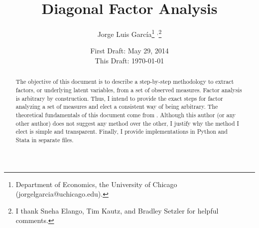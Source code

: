 



\title{Diagonal Factor Analysis}
\author{Jorge Luis Garc\'{i}a\thanks{Department of Economics, the University of Chicago (jorgelgarcia@uchicago.edu).} $^{,}$\thanks{I thank Sneha Elango, Tim Kautz, and Bradley Setzler for helpful comments.}}
\date{First Draft: May 29, 2014 \\ This Draft: \today}
\maketitle


\begin{abstract}
\noindent The objective of this document is to describe a step-by-step methodology to extract factors, or underlying latent variables, from a set of observed measures. Factor analysis is arbitrary by construction. Thus, I intend to provide the exact steps for factor analyzing a set of measures and elect a consistent way of being arbitrary. The theoretical fundamentals of this document come from \citet{gorsuch1983factor}. Although this author (or any other author) does not suggest any method over the other, I justify why the method I elect is simple and transparent. Finally, I provide implementations in Python and Stata in separate files.
\end{abstract}








\clearpage



